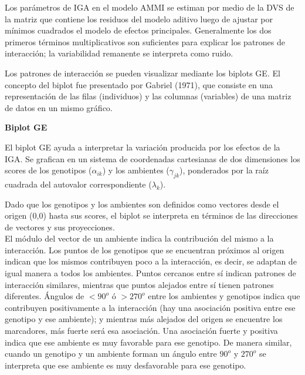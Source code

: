 Los parámetros de IGA en el modelo AMMI se estiman por medio de la DVS de la matriz que contiene los residuos del modelo aditivo luego de ajustar por mínimos cuadrados el modelo de efectos principales. Generalmente los dos primeros términos multiplicativos son suficientes para explicar los patrones de interacción; la variabilidad remanente se interpreta como ruido. 

Los patrones de interacción se pueden visualizar mediante los biplots GE. El concepto del biplot fue presentado por Gabriel (1971), que consiste en una representación de las filas (individuos) y las columnas (variables) de una matriz de datos en un mismo gráfico. 


\textbf{Biplot GE}

El biplot GE ayuda a interpretar la variación producida por los efectos de la IGA. Se grafican en un sistema de coordenadas cartesianas de dos dimensiones los scores de los genotipos ($\alpha_{ik}$) y los ambientes ($\gamma_{jk}$), ponderados por la raíz cuadrada del autovalor correspondiente ($\lambda_k$).

Dado que los genotipos y los ambientes son definidos como vectores desde el origen (0,0) hasta sus scores, el biplot se interpreta en términos de las direcciones de vectores y sus proyecciones.\\

El módulo del vector de un ambiente indica la contribución del mismo a la interacción. Los puntos de los genotipos que se encuentran próximos al origen indican que los mismos contribuyen poco a la interacción, es decir, se adaptan de igual manera a todos los ambientes. Puntos cercanos entre sí indican patrones de interacción similares, mientras que puntos alejados entre sí tienen patrones diferentes. Ángulos de $< 90^o$ ó $> 270^o$ entre los ambientes y genotipos indica que contribuyen positivamente a la interacción (hay una asociación positiva entre ese genotipo y ese ambiente); y mientras más alejados del origen se encuentre los marcadores, más fuerte será esa asociación. Una asociación fuerte y positiva indica que ese ambiente es muy favorable para ese genotipo. De manera similar, cuando un genotipo y un ambiente forman un ángulo entre $90^o$ y $270^o$ se interpreta que ese ambiente es muy desfavorable para ese genotipo.\\


